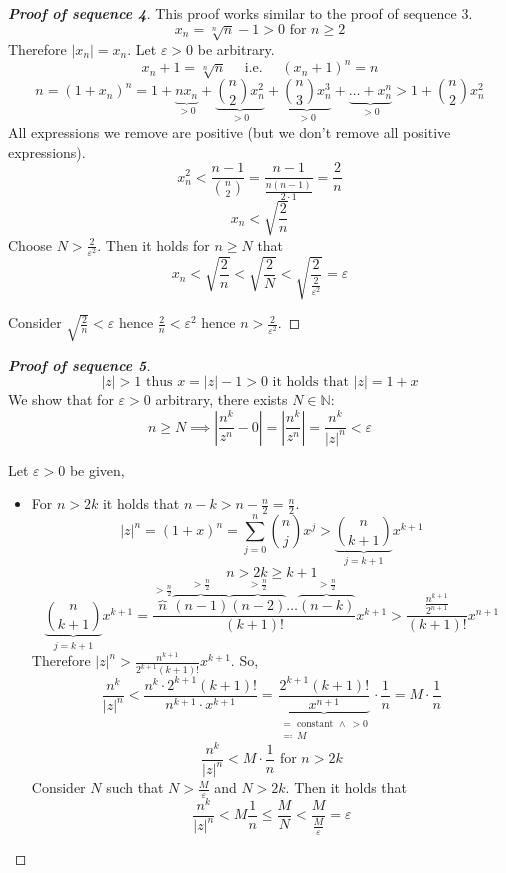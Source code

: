 \documentclass[a4paper,landscape,twocolumn]{article}
\theoremstyle{definition}
\newcommand\abs[1]{\left|#1\right|}
\begin{document}
\begin{proof}[\textbf{Proof of sequence 4}]
  This proof works similar to the proof of sequence 3.
  \[ x_n = \sqrt[n]{n} - 1 > 0 \text{ for } n \geq 2 \]
  Therefore $\abs{x_n} = x_n$. Let $\varepsilon > 0$ be arbitrary.
  \[ x_n + 1 = \sqrt[n]{n} \quad\text{ i.e. }\quad (x_n + 1)^n = n \]
  \[
      n = (1 + x_n)^n
      = 1 + \underbrace{nx_n}_{> 0} + \underbrace{\binom n2 x_n^2}_{> 0} + \underbrace{\binom n3 x_n^3}_{>0} + \underbrace{\dots + x_n^n}_{> 0}
      > 1 + \binom n2 x_n^2
  \]
  All expressions we remove are positive (but we don't remove all positive expressions).
  \[ x_n^2 < \frac{n-1}{\binom n2} = \frac{n-1}{\frac{n(n-1)}{2 \cdot 1}} = \frac2n \]
  \[ x_n < \sqrt{\frac2n} \]
  Choose $N > \frac2{\varepsilon^2}$. Then it holds for $n \geq N$ that
  \[ x_n < \sqrt{\frac2n} < \sqrt{\frac2N} < \sqrt{\frac2{\frac2{\varepsilon^2}}} = \varepsilon \]

  Consider $\sqrt{\frac2n} < \varepsilon$ hence $\frac2n < \varepsilon^2$ hence $n > \frac2{\varepsilon^2}$.
\end{proof}

\begin{proof}[\textbf{Proof of sequence 5}]
  \[ \abs{z} > 1 \text{ thus } x = \abs{z} - 1 > 0 \text{ it holds that } \abs{z} = 1 + x \]
  We show that for $\varepsilon > 0$ arbitrary, there exists $N \in \mathbb N$:
  \[ n \geq N \implies \abs{\frac{n^k}{z^n} - 0} = \abs{\frac{n^k}{z^n}} = \frac{n^k}{\abs{z}^n} < \varepsilon \]

  Let $\varepsilon > 0$ be given,
  \begin{itemize}
    \item
      For $n > 2k$ it holds that $n - k > n - \frac{n}2 = \frac{n}2$.
      \[ \abs{z}^n = (1 + x)^n = \sum_{j=0}^n \binom{n}{j} x^j > \underbrace{\binom{n}{k + 1}}_{j=k+1} x^{k+1} \]
      \[ n > 2k \geq k + 1 \]
      \[
          \underbrace{\binom{n}{k + 1}}_{j=k+1} x^{k+1}
          = \frac{\overbrace{n}^{>\frac{n}2} \overbrace{(n-1)}^{>\frac{n}2} \overbrace{(n-2)}^{>\frac{n}2} \dots \overbrace{(n-k)}^{>\frac{n}2}}{(k+1)!} x^{k+1}
          > \frac{\frac{n^{k+1}}{2^{n+1}}}{(k+1)!} x^{n+1}
      \]
      Therefore $\abs{z}^n > \frac{n^{k+1}}{2^{k+1} (k+1)!} x^{k+1}$.
      So,
      \[
          \frac{n^k}{\abs{z}^n} <
          \frac{n^k \cdot 2^{k+1} (k+1)!}{n^{k+1} \cdot x^{k+1}} =
          \underbrace{\frac{2^{k+1} (k+1)!}{x^{n+1}}}_{\substack{= \text{ constant } \land\ >0 \\ \eqqcolon\ M}} \cdot \frac1n
          = M \cdot \frac1n
      \] \[
          \frac{n^k}{\abs{z}^n} < M \cdot \frac1n \text{ for } n > 2k
      \]
      Consider $N$ such that $N > \frac{M}{\varepsilon}$ and $N > 2k$.
      Then it holds that
      \[ \frac{n^k}{\abs{z}^n} < M \frac1n \leq \frac{M}{N} < \frac{M}{\frac{M}{\varepsilon}} = \varepsilon \]
  \end{itemize}
\end{proof}
\end{document}
